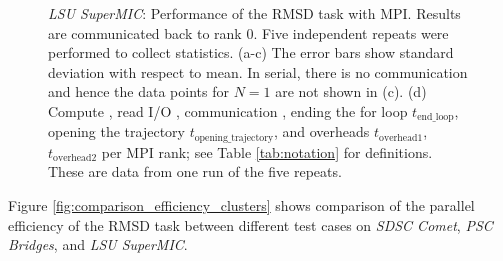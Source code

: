 \begin{figure}[!htb]
\begin{subfigure} {.5\textwidth}
    \label{fig:MPIranks-SuperMIC}
  \end{subfigure}
  \caption{\emph{LSU SuperMIC}: Performance of the RMSD task with MPI.
    Results are communicated back to rank 0.
    Five independent repeats were performed to collect statistics.
    (a-c) The error bars show standard deviation with respect to mean.
    In serial, there is no communication and hence the data points for $N=1$ are not shown in (c).
    (d) Compute \tcomp, read I/O \tIO, communication \tcomm, ending the for loop $t_{\text{end\_loop}}$,  opening the trajectory $t_{\text{opening\_trajectory}}$, and overheads $t_{\text{overhead1}}$, $t_{\text{overhead2}}$ per MPI rank; see Table \ref{tab:notation} for definitions.
    These are data from one run of the five repeats.
  }
  \label{fig:MPIwithIO-SuperMIC}
\end{figure} 


Figure \ref{fig:comparison_efficiency_clusters} shows comparison of the parallel efficiency of the RMSD task between different test cases on \emph{SDSC Comet}, \emph{PSC Bridges}, and \emph{LSU SuperMIC}.  

